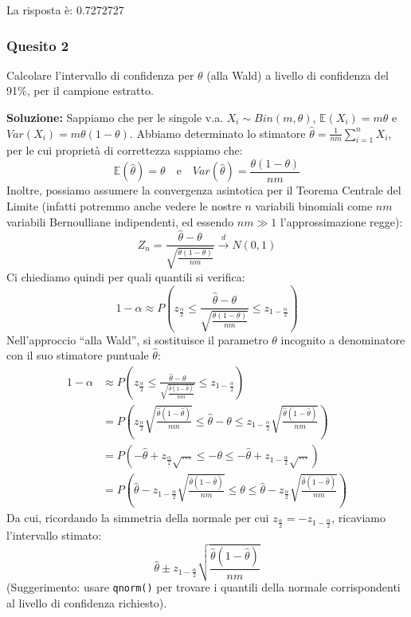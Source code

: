 \documentclass[12pt, a4paper]{article}
\begin{document}
La risposta è: 0.7272727

\subsubsection*{Quesito 2}
Calcolare l’intervallo di confidenza per $\theta$ (alla Wald) a livello di confidenza del 91\%, per il campione estratto.

\textbf{Soluzione:}
Sappiamo che per le singole v.a. $X_i \sim Bin(m,\theta)$, $\mathbb{E}(X_i) = m\theta$ e $Var(X_i) = m\theta(1-\theta)$.
Abbiamo determinato lo stimatore $\hat{\theta} = \frac{1}{nm} \sum_{i=1}^n X_i$, per le cui proprietà di correttezza sappiamo che:
$$ \mathbb{E}(\hat{\theta}) = \theta \quad \text{e} \quad Var(\hat{\theta}) = \frac{\theta(1-\theta)}{nm} $$
Inoltre, possiamo assumere la convergenza asintotica per il Teorema Centrale del Limite (infatti potremmo anche vedere le nostre $n$ variabili binomiali come $nm$ variabili Bernoulliane indipendenti, ed essendo $nm \gg 1$ l'approssimazione regge):
$$ Z_n = \frac{\hat{\theta} - \theta}{\sqrt{\frac{\theta(1-\theta)}{nm}}} \xrightarrow{d} N(0,1) $$
Ci chiediamo quindi per quali quantili si verifica:
$$ 1-\alpha \approx P\left( z_{\frac{\alpha}{2}} \leq \frac{\hat{\theta} - \theta}{\sqrt{\frac{\theta(1-\theta)}{nm}}} \leq z_{1-\frac{\alpha}{2}} \right) $$
Nell'approccio ``alla Wald'', si sostituisce il parametro $\theta$ incognito a denominatore con il suo stimatore puntuale $\hat{\theta}$:
$$ \begin{aligned} 1-\alpha &\approx P\left( z_{\frac{\alpha}{2}} \leq \frac{\hat{\theta} - \theta}{\sqrt{\frac{\hat{\theta}(1-\hat{\theta})}{nm}}} \leq z_{1-\frac{\alpha}{2}} \right) \\ &= P\left( z_{\frac{\alpha}{2}} \sqrt{\frac{\hat{\theta}(1-\hat{\theta})}{nm}} \leq \hat{\theta} - \theta \leq z_{1-\frac{\alpha}{2}} \sqrt{\frac{\hat{\theta}(1-\hat{\theta})}{nm}} \right) \\ &= P\left( -\hat{\theta} + z_{\frac{\alpha}{2}} \sqrt{\dots} \leq -\theta \leq -\hat{\theta} + z_{1-\frac{\alpha}{2}} \sqrt{\dots} \right) \\ &= P\left( \hat{\theta} - z_{1-\frac{\alpha}{2}} \sqrt{\frac{\hat{\theta}(1-\hat{\theta})}{nm}} \leq \theta \leq \hat{\theta} - z_{\frac{\alpha}{2}} \sqrt{\frac{\hat{\theta}(1-\hat{\theta})}{nm}} \right) \end{aligned} $$
Da cui, ricordando la simmetria della normale per cui $z_{\frac{\alpha}{2}} = -z_{1-\frac{\alpha}{2}}$, ricaviamo l'intervallo stimato:
$$ \hat{\theta} \pm z_{1-\frac{\alpha}{2}} \sqrt{\frac{\hat{\theta}(1-\hat{\theta})}{nm}} $$
(Suggerimento: usare \texttt{qnorm()} per trovare i quantili della normale corrispondenti al livello di confidenza richiesto).
\end{document}
